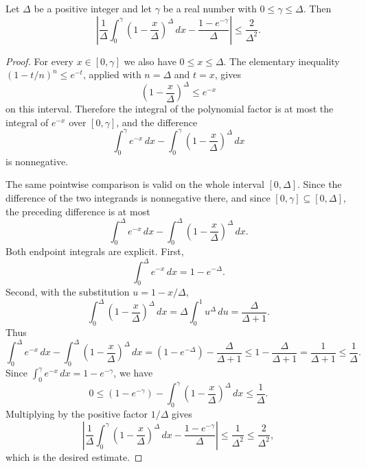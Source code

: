 \begin{helper}
Let $\Delta$ be a positive integer and let $\gamma$ be a real number with
$0\le \gamma\le \Delta$.  Then
\[
\left|
\frac1\Delta\int_0^\gamma \left(1-\frac{x}{\Delta}\right)^\Delta\,dx
-\frac{1-e^{-\gamma}}{\Delta}
\right|
\le \frac2{\Delta^2}.
\]
\end{helper}
\begin{proof}
For every $x\in[0,\gamma]$ we also have $0\le x\le\Delta$.  The elementary
inequality $(1-t/n)^n\le e^{-t}$, applied with $n=\Delta$ and $t=x$, gives
\[
\left(1-\frac{x}{\Delta}\right)^\Delta\le e^{-x}
\]
on this interval.  Therefore the integral of the polynomial factor is at most
the integral of $e^{-x}$ over $[0,\gamma]$, and the difference
\[
\int_0^\gamma e^{-x}\,dx-
\int_0^\gamma \left(1-\frac{x}{\Delta}\right)^\Delta\,dx
\]
is nonnegative.

The same pointwise comparison is valid on the whole interval $[0,\Delta]$.
Since the difference of the two integrands is nonnegative there, and since
$[0,\gamma]\subseteq[0,\Delta]$, the preceding difference is at most
\[
\int_0^\Delta e^{-x}\,dx-
\int_0^\Delta \left(1-\frac{x}{\Delta}\right)^\Delta\,dx .
\]
Both endpoint integrals are explicit.  First,
\[
\int_0^\Delta e^{-x}\,dx=1-e^{-\Delta}.
\]
Second, with the substitution $u=1-x/\Delta$,
\[
\int_0^\Delta \left(1-\frac{x}{\Delta}\right)^\Delta\,dx
=\Delta\int_0^1 u^\Delta\,du
=\frac{\Delta}{\Delta+1}.
\]
Thus
\[
\int_0^\Delta e^{-x}\,dx-
\int_0^\Delta \left(1-\frac{x}{\Delta}\right)^\Delta\,dx
=(1-e^{-\Delta})-\frac{\Delta}{\Delta+1}
\le 1-\frac{\Delta}{\Delta+1}
=\frac1{\Delta+1}
\le\frac1\Delta .
\]
Since $\int_0^\gamma e^{-x}\,dx=1-e^{-\gamma}$, we have
\[
0\le
(1-e^{-\gamma})-
\int_0^\gamma\left(1-\frac{x}{\Delta}\right)^\Delta\,dx
\le \frac1\Delta .
\]
Multiplying by the positive factor $1/\Delta$ gives
\[
\left|
\frac1\Delta\int_0^\gamma \left(1-\frac{x}{\Delta}\right)^\Delta\,dx
-\frac{1-e^{-\gamma}}{\Delta}
\right|
\le \frac1{\Delta^2}\le \frac2{\Delta^2},
\]
which is the desired estimate.
\end{proof}
